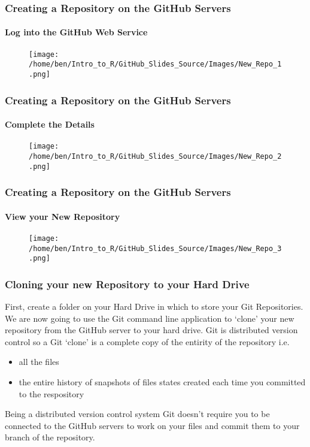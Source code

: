 \documentclass[xcolor=dvipsnames]{beamer}
\begin{document}
\begin{frame}
\frametitle{Creating a Repository on the GitHub Servers}
\framesubtitle{Log into the GitHub Web Service}
\begin{center}
\begin{figure}
\texttt{[image: /home/ben/Intro\_to\_R/GitHub\_Slides\_Source/Images/New\_Repo\_1.png]}
\end{figure}
\end{center}
\end{frame}

\begin{frame}
\frametitle{Creating a Repository on the GitHub Servers}
\framesubtitle{Complete the Details}
\begin{center}
\begin{figure}
\texttt{[image: /home/ben/Intro\_to\_R/GitHub\_Slides\_Source/Images/New\_Repo\_2.png]}
\end{figure}
\end{center}
\end{frame}

\begin{frame}
\frametitle{Creating a Repository on the GitHub Servers}
\framesubtitle{View your New Repository}
\begin{center}
\begin{figure}
\texttt{[image: /home/ben/Intro\_to\_R/GitHub\_Slides\_Source/Images/New\_Repo\_3.png]}
\end{figure}
\end{center}
\end{frame}

\begin{frame}
\frametitle{Cloning your new Repository to your Hard Drive}

First, create a folder on your Hard Drive in which to store your Git Repositories.  
\newline
\newline
We are now going to use the Git command line application to `clone' your new repository from the GitHub server to your hard drive.
\newline
\newline
Git is distributed version control so a Git `clone' is a complete copy of the entirity of the repository i.e.\begin{itemize}
\item all the files
\item the entire history of snapshots of files states created each time you committed to the respository
\newline \end{itemize}
Being a distributed version control system Git doesn't require you to be connected to the GitHub servers to work on your files and commit them to your branch of the repository.

\end{frame}
\end{document}
